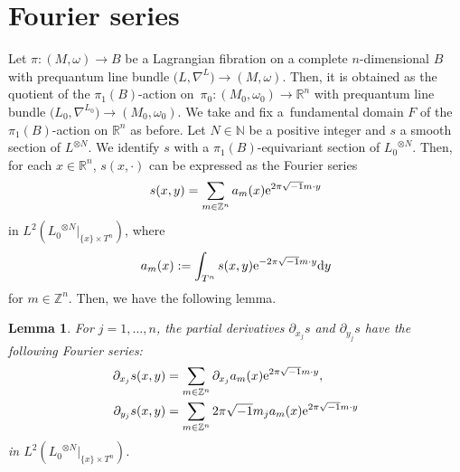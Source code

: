 \documentclass[10pt,a4paper]{amsart}
\numberwithin{equation}{section}
\newtheorem{Lemma}[Theorem]{Lemma}
\newcommand{\R}{\mathbb{R}}
\newcommand{\Z}{\mathbb{Z}}
\newcommand{\N}{\mathbb{N}}
\begin{document}
\appendix
\section{Fourier series}\label{appendixA}
Let $\pi\colon (M,\omega)\to B$ be a Lagrangian fibration on a complete $n$-dimensional $B$ with prequantum line bundle $\bigl(L,\nabla^L\bigr)\to (M,\omega)$. Then, it is obtained as the quotient of the $\pi_1(B)$-action on~${\pi_0\colon (M_0,\omega_0)\to \R^n}$ with prequantum line bundle $\bigl({L_0}, \nabla^{L_0}\bigr)\to (M_0,\omega_0)$. We take and fix a~fundamental domain $F$ of the $\pi_1(B)$-action on $\R^n$ as before.
%
Let $N\in \N$ be a positive integer and $s$ a smooth section of $L^{\otimes N}$. We identify $s$ with a $\pi_1(B)$-equivariant section of ${L_0}^{\otimes N}$. Then, for each $x\in \R^n$, $s(x, \cdot )$ can be expressed as the Fourier series
\begin{equation}\label{Fourier_again}
s(x,y)=\sum_{m\in \Z^n}a_m(x){\rm e}^{2\pi\sqrt{-1}m\cdot y}
\end{equation}
in $L^2\left({L_0}^{\otimes N}|_{\{x\}\times T^n}\right)$, where
\[
a_m(x):=\int_{T^n}s(x,y){\rm e}^{-2\pi\sqrt{-1}m\cdot y}{\rm d}y
\]
for $m\in \Z^n$. Then, we have the following lemma.
\begin{Lemma}\label{Fourier for derivatives}
For $j=1,\ldots , n$, the partial derivatives $\partial_{x_j}s$ and $\partial_{y_j}s$ have the following Fourier series:
\begin{align*}
\partial_{x_j}s(x,y)&=\sum_{m\in \Z^n}\partial_{x_j}a_m(x){\rm e}^{2\pi\sqrt{-1}m\cdot y},\\%
\partial_{y_j}s(x,y)&=\sum_{m\in \Z^n}2\pi\sqrt{-1}m_ja_m(x){\rm e}^{2\pi\sqrt{-1}m\cdot y} %
\end{align*}
in $L^2\left({L_0}^{\otimes N}|_{\{x\}\times T^n}\right)$.
\end{Lemma}
\end{document}
